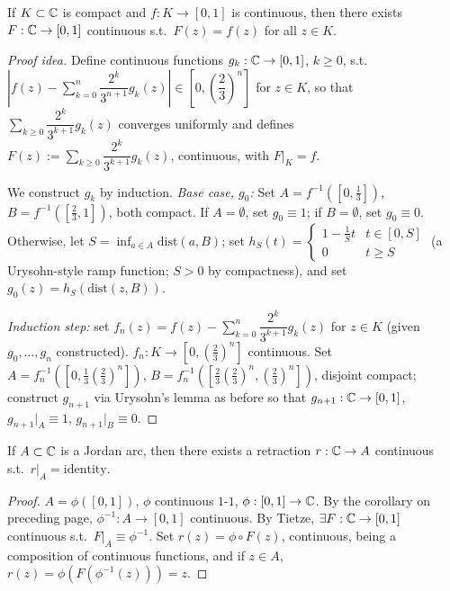 \documentclass[11pt]{article}
\begin{document}
\begin{theorem}
If $K\subset{\mathbb{C}}$ is compact and $f:K\to[0,1]$ is continuous, then there exists $F:{\mathbb{C}}\to[0,1]$ continuous s.t.\ $F(z)=f(z)$ for all $z\in K$.
\end{theorem}
\begin{proof}[Proof idea]
Define continuous functions $g_k:{\mathbb{C}}\to[0,1]$, $k\ge0$, s.t.\ $\left|f(z) - \sum_{k=0}^n \dfrac{2^k}{3^{n+1}}g_k(z)\right| \in \left[0,\left(\dfrac23\right)^n\right]$ for $z\in K$, so that $\sum_{k\ge0} \dfrac{2^k}{3^{k+1}}g_k(z)$ converges uniformly and defines $F(z) := \sum_{k\ge0}\dfrac{2^k}{3^{k+1}}g_k(z)$, continuous, with $F|_K=f$.

We construct $g_k$ by induction. \emph{Base case, $g_0$:} Set $A=f^{-1}\left(\left[0,\tfrac13\right]\right)$, $B=f^{-1}\left(\left[\tfrac23,1\right]\right)$, both compact. If $A=\emptyset$, set $g_0\equiv1$; if $B=\emptyset$, set $g_0\equiv0$. Otherwise, let $S = \inf_{a\in A} \mathrm{dist}(a,B)$; set $h_S(t) = \begin{cases} 1-\tfrac{1}{S}t & t\in[0,S]\\ 0 & t\ge S\end{cases}$ (a Urysohn-style ramp function; $S>0$ by compactness), and set $g_0(z) = h_S(\mathrm{dist}(z,B))$.

\emph{Induction step:} set $f_n(z) = f(z) - \sum_{k=0}^n \dfrac{2^k}{3^{k+1}}g_k(z)$ for $z\in K$ (given $g_0,\dots,g_n$ constructed). $f_n:K\to\left[0,\left(\tfrac23\right)^n\right]$ continuous. Set $A=f_n^{-1}\left(\left[0,\tfrac13\left(\tfrac23\right)^n\right]\right)$, $B=f_n^{-1}\left(\left[\tfrac23\left(\tfrac23\right)^n,\left(\tfrac23\right)^n\right]\right)$, disjoint compact; construct $g_{n+1}$ via Urysohn's lemma as before so that $g_{n+1}:{\mathbb{C}}\to[0,1]$, $g_{n+1}|_A\equiv1$, $g_{n+1}|_B\equiv0$.
\end{proof}

\begin{theorem}[Corollary]
If $A\subset{\mathbb{C}}$ is a Jordan arc, then there exists a retraction $r:{\mathbb{C}}\to A$ continuous s.t.\ $r|_A = \mathrm{identity}$.
\end{theorem}
\begin{proof}
$A=\phi([0,1])$, $\phi$ continuous $1$-$1$, $\phi:[0,1]\to{\mathbb{C}}$. By the corollary on preceding page, $\phi^{-1}:A\to[0,1]$ continuous. By Tietze, $\exists F:{\mathbb{C}}\to[0,1]$ continuous s.t.\ $F|_A \equiv \phi^{-1}$. Set $r(z) = \phi\circ F(z)$, continuous, being a composition of continuous functions, and if $z\in A$, $r(z) = \phi(F(\phi^{-1}(z))) = z$.
\end{proof}
\end{document}
